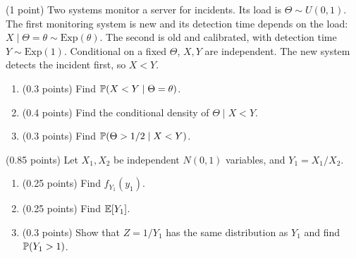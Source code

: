 \documentclass[a4paper]{report}
\begin{document}
\begin{problem} (1 point)
Two systems monitor a server for incidents. Its load is $\Theta\sim U(0,1)$. The first monitoring system is new and its detection time depends on the load: $X\mid\Theta=\theta\sim\mathrm{Exp}(\theta)$. The second is old and calibrated, with detection time $Y\sim\mathrm{Exp}(1)$. Conditional on a fixed $\Theta$, $X,Y$ are independent. The new system detects the incident first, so $X<Y$.
\begin{enumerate}
\item (0.3 points) Find $\P(X<Y\mid\Theta=\theta)$.
\item (0.4 points) Find the conditional density of $\Theta\mid X<Y$.
\item (0.3 points) Find $\P(\Theta>1/2\mid X<Y)$.
\end{enumerate}
\end{problem}
\begin{problem} (0.85 points)
Let $X_1,X_2$ be independent $N(0,1)$ variables, and $Y_1=X_1/X_2$.
\begin{enumerate}
\item (0.25 points) Find $f_{Y_1}(y_1)$.
\item (0.25 points) Find $\E[Y_1]$.
\item (0.3 points) Show that $Z=1/Y_1$ has the same distribution as $Y_1$ and find $\P(Y_1>1)$.
\end{enumerate}
\end{problem}
\end{document}
